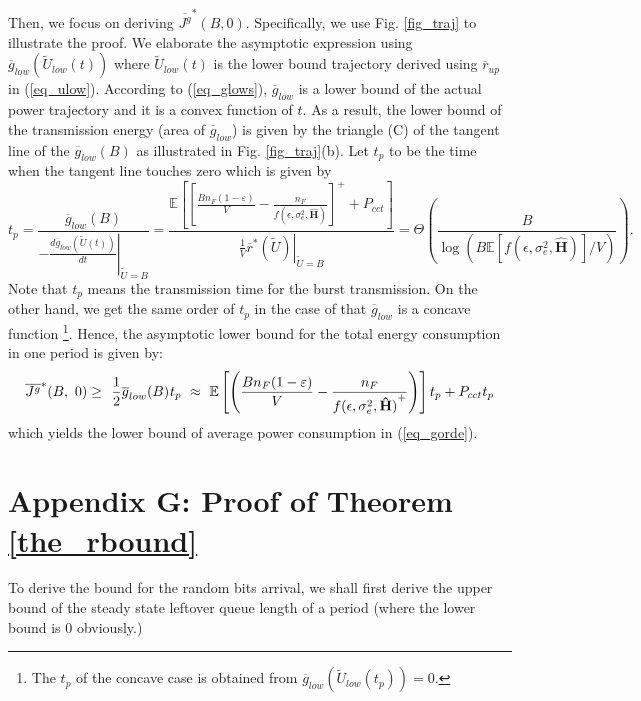 \documentclass[11pt,journal, onecolumn]{./IEEEtran}
\newcommand{\red}{\color{black}}
\begin{document}
{\red Then, we focus on deriving ${\overline {{J^g}} ^*}(B,0)$. Specifically, we use Fig. \ref{fig_traj} to illustrate the proof. We elaborate the asymptotic expression using $\overline g_{low}(\widetilde U_{low}(t))$ where $\widetilde U_{low}(t)$ is the lower bound trajectory derived using $\overline r_{up}$ in (\ref{eq_ulow}). According to (\ref{eq_glows}), $\overline g_{low}$ is a lower bound of the actual power trajectory and it is a convex function of $t$. As a result, the lower bound of the transmission energy (area of $\overline g_{low}$) is given by the triangle (C) of the tangent line of the $\overline g_{low}(B)$ as illustrated in Fig. \ref{fig_traj}(b). Let $t_p$ to be the time when the tangent line touches zero which is given by
\[{t_p} = \frac{{{{\overline g }_{low}}(B)}}{{{{\left. { - \frac{{d{{\overline g }_{low}}(\widetilde U(t))}}{{dt}}} \right|}_{\widetilde U = B}}}} = \frac{{\mathbb E\left[ {{{\left[ {\frac{{{B }{n_F}(1 - {\varepsilon})}}{V} - \frac{{{n_F}}}{{f(\epsilon,\sigma_e^2,\mathbf{\hat{H}})}}} \right]}^ + } + {P_{cct}}} \right]}}{{{{\left. {\frac{1}{V}{{\overline r }^*}(\widetilde U)} \right|}_{\widetilde U = B}}}} = \Theta \left( {\frac{B}{{ \log ({B }\mathbb{E}[f(\epsilon,\sigma_e^2,\mathbf{\hat{H}})]/V)}}} \right).\]
Note that $t_p$ means the transmission time for the burst transmission. On the other hand, we get the same order of $t_p$ in the case of that $\overline g_{low}$ is a concave function \footnote{The $t_p$ of the concave case is obtained from $\overline g_{low}(\widetilde U_{low}(t_p))=0$.}. Hence, the asymptotic lower bound for the total energy consumption in one period is given by:
\[\overline {{J^g}}^*(B,\,\,0)  \ge \,{\mkern 1mu} \,\frac{1}{2}{\overline g _{low}}(B){\mkern 1mu} {t_p}\,\, \approx \,\,\mathbb E\left[ \left( {\frac{{{B }{n_F}(1 - {\varepsilon})}}{V} - \frac{{{n_F}}}{{f(\epsilon,\sigma_e^2,\mathbf{\hat{H}})}^ + }} \right) \right]{t_p} + {P_{cct}}{t_p}{\mkern 1mu} \]
which yields the lower bound of average power consumption in (\ref{eq_gorde}).}







\section*{Appendix G: Proof of Theorem \ref{the_rbound}}\label{app_rbound}
{\red To derive the bound for the random bits arrival, we shall first derive the upper bound of the steady state leftover queue length of a period (where the lower bound is 0 obviously.)}
\end{document}

